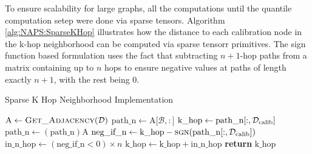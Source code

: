 To ensure scalability for large graphs, all the computations until the quantile computation setep were done via sparse tensors. 
Algorithm \ref{alg:NAPS:SparseKHop} illustrates how the distance to each calibration node in the k-hop neighborhood can be computed via  sparse tensorr primitives.
The sign function based formulation uses the fact that subtracting $n+1$-hop paths from a matrix containing up to $n$ hops to ensure negative values at paths of length exactly $n+1$, with the rest being 0.

\begin{algorithm}
\caption{Sparse K Hop Neighborhood Implementation}\label{alg:NAPS:SparseKHop}
\begin{algorithmic}[1]
    \State $\text{A}\gets \Call{\text{Get\_Adjacency}}{\mathcal{D}}$ 
    \State $\text{path\_n}\gets \text{A[$\mathcal{B},:$]}$
    \State $\text{k\_hop}\gets \text{path\_n[$:,\mathcal{D_{\mathrm{calib}}}$]}$
        \State $\text{path\_n} \gets (\text{path\_n})\text{A}$
        \State $\text{neg\_if\_n}\gets \text{k\_hop}-\Call{\text{sgn}}{\text{path\_n[$:,\calib$]}}$
        \State $\text{in\_n\_hop}\gets (\text{neg\_if\_n}<0)\times n$ 
        \State $\text{k\_hop} \gets \text{k\_hop} + \text{in\_n\_hop}$
    \EndFor\label{khopendwhile}
    \State \textbf{return} $\text{k\_hop}$
\EndProcedure
\end{algorithmic}
\end{algorithm}